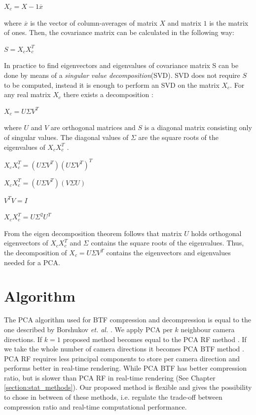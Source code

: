 {\centering$X_{c}=X-1\overline{x}$\\}

where $\overline{x}$ is the vector of column-averages of matrix $X$ and matrix $1$ is the matrix of ones.
Then, the covariance matrix can be calculated in the following way:

{\centering$S=X_{c}X_{c}^T$\\}


In practice to find eigenvectors and eigenvalues of covariance matrix S can be done by means of a \emph{singular value decomposition}(SVD).
SVD does not require $S$ to be computed, instead it is enough to perform an SVD on the matrix $X_{c}$.
For any real matrix $X_{c}$ there exists a decomposition \cite{svd}:

{\centering $X_{c}=U\Sigma V^{T}$ \\}

where $U$ and $V$ are orthogonal matrices and $S$ is a diagonal matrix consisting only of singular values.
The diagonal values of $\Sigma$ are the square roots of the eigenvalues of $X_{c}X_{c}^T$ \cite{Lecture12A}.


{\centering $X_{c}X_{c}^T=(U\Sigma V^{T})(U\Sigma V^{T})^T$ \\}

{\centering $X_{c}X_{c}^T=(U\Sigma V^{T})(V\Sigma U)$ \\}

{\centering $V^{T}V=I$ \\}

{\centering $X_{c}X_{c}^T=U\Sigma^2 U^{T}$ \\}

From the eigen decomposition theorem \cite{eigendecompostion} follows that matrix $U$ holds orthogonal eigenvectors of $X_{c}X_{c}^T$
and $\Sigma$ contains the square roots of the eigenvalues.
Thus, the decomposition of $X_{c}=U\Sigma V^{T}$ contains the eigenvectors and eigenvalues needed for a PCA.

\section{Algorithm}
\label{section:algorithm_step}
The PCA algorithm used for BTF compression and decompression is equal to the one described by Borshukov  \emph{et. al.} \cite[Ch.\ 15]{gpu_gems}.
We apply PCA per $k$ neighbour camera directions. 
 If $k=1$ proposed method becomes equal to the PCA RF method \cite{haindl}. 
If we take the whole number of camera directions it becomes PCA BTF method \cite{haindl}.
PCA RF requires less principal components to store per camera direction and performs better in real-time rendering. 
While PCA BTF has better compression ratio, but is slower than PCA RF in real-time rendering (See Chapter \ref{section:stat_methods}).
Our proposed method is flexible and gives the possibility to chose in between of these methods, i.e. regulate the trade-off between compression ratio and real-time computational performance.

